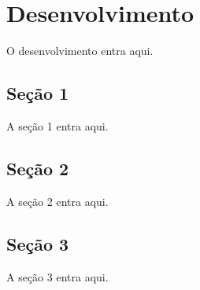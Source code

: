 \chapter{Desenvolvimento}
O desenvolvimento entra aqui.

\section{Seção 1}
A seção 1 entra aqui.

\section{Seção 2}
A seção 2 entra aqui.

\section{Seção 3}
A seção 3 entra aqui.